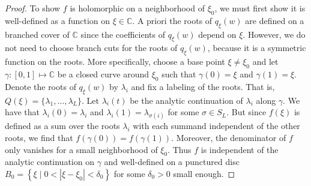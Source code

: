 \documentclass[a4paper,11pt]{article}
\theoremstyle{definition}
\begin{document}
\begin{proof}
    To show $f$ is holomorphic on a neighborhood of $\xi_0$, we must first show it is well-defined as a function on $\xi\in\mathbb{C}$. A priori the roots of $q_\xi(w)$ are defined on a branched cover of $\mathbb{C}$ since the coefficients of $q_\xi(w)$ depend on $\xi$. However, we do not need to choose branch cuts for the roots of $q_\xi(w)$, because it is a symmetric function on the roots. More specifically, choose a base point $\xi\neq\xi_0$ and let $\gamma:[0,1]\mapsto\mathbb{C}$ be a closed curve around $\xi_0$ such that $\gamma(0)=\xi$ and $\gamma(1)=\xi$. Denote the roots of $q_\xi(w)$ by $\lambda_i$ and fix a labeling of the roots. That is, $Q(\xi)=\{\lambda_1,\ldots,\lambda_L\}$. Let $\lambda_i(t)$ be the analytic continuation of $\lambda_i$ along $\gamma$. We have that $\lambda_i(0)=\lambda_i$ and $\lambda_i(1)=\lambda_{\sigma(i)}$ for some $\sigma\in S_L$. But since $f(\xi)$ is defined as a sum over the roots $\lambda_i$ with each summand independent of the other roots, we find that $f(\gamma(0))=f(\gamma(1))$. Moreover, the denominator of $f$ only vanishes for a small neighborhood of $\xi_0$. Thus $f$ is independent of the analytic continuation on $\gamma$ and well-defined on a punctured disc $B_0=\left\{\xi\mid 0<|\xi-\xi_0|<\delta_0 \right\}$ for some $\delta_0>0$ small enough. 


\end{proof}
\end{document}
